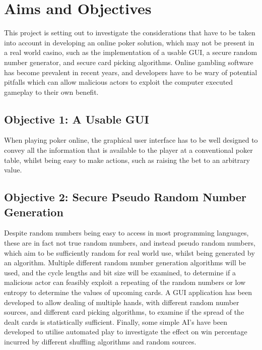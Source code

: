 \section{Aims and Objectives}
This project is setting out to investigate the considerations that have to be
taken into account in developing an online poker solution, which may not be
present in a real world casino, such as the implementation of a usable GUI, 
a secure random number generator, and secure card picking algorithms. Online 
gambling software has become prevalent in recent years, and developers have to 
be wary of potential pitfalls which can allow malicious actors to exploit the 
computer executed gameplay to their own benefit.

\subsection{Objective 1: A Usable GUI}
When playing poker online, the graphical user interface has to be well designed
to convey all the information that is available to the player at a conventional
poker table, whilst being easy to make actions, such as raising the bet to
an arbitrary value.

\subsection{Objective 2: Secure Pseudo Random Number Generation}
Despite random numbers being easy to access in most programming languages, 
these are in fact not true random numbers, and instead pseudo random numbers, 
which aim to be sufficiently random for real world use, whilst being generated 
by an algorithm. Multiple different random number generation algorithms will
be used, and the cycle lengths and bit size will be examined, to determine if 
a malicious actor can feasibly exploit a repeating of the random numbers or 
low entropy to determine the values of upcoming cards. A GUI application has
been developed to allow dealing of multiple hands, with different random number
sources, and different card picking algorithms, to examine if the spread of
the dealt cards is statistically sufficient. Finally, some simple AI's have
been developed to utilise automated play to investigate the effect on win
percentage incurred by different shuffling algorithms and random sources.
